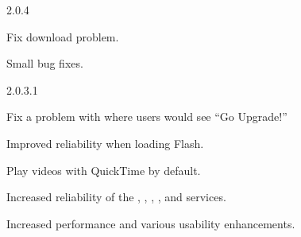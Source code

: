 \begin{changelog}{2.0.4}
\item Fix  download problem.
\item Small bug fixes.
\end{changelog}

\begin{changelog}{2.0.3.1}
\item Fix a problem with  where users would see ``Go Upgrade!'' 
\item Improved reliability when loading Flash. 
\item Play videos with QuickTime by default.
\item Increased reliability of the , , , , and  services.
\item Increased performance and various usability enhancements.
\end{changelog}

